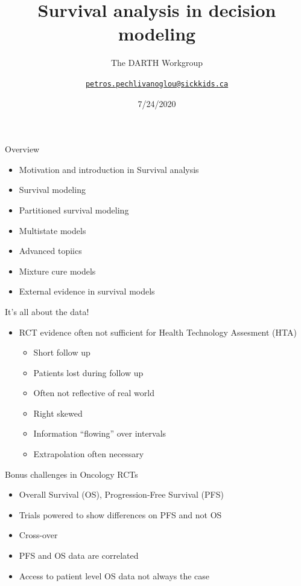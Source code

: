 \documentclass[ignorenonframetext,]{beamer}
\title{Survival analysis in decision modeling}
\subtitle{The DARTH Workgroup}
\author{\href{mailto:petros.pechlivanoglou@sickkids.ca}{\nolinkurl{petros.pechlivanoglou@sickkids.ca}}}
\date{7/24/2020}
\providecommand{\tightlist}{%
  \setlength{\itemsep}{0pt}\setlength{\parskip}{0pt}}
\begin{document}
\frame{\titlepage}

\begin{frame}{Overview}

\begin{itemize}
\tightlist
\item
  Motivation and introduction in Survival analysis
\item
  Survival modeling
\item
  Partitioned survival modeling
\item
  Multistate models
\item
  Advanced topiics
\item
  Mixture cure models
\item
  External evidence in survival models
\end{itemize}

\end{frame}

\begin{frame}{It's all about the data!}

\begin{itemize}
\tightlist
\item
  RCT evidence often not sufficient for Health Technology Assesment
  (HTA)

  \begin{itemize}
  \tightlist
  \item
    Short follow up
  \item
    Patients lost during follow up
  \item
    Often not reflective of real world
  \item
    Right skewed\\
  \item
    Information ``flowing'' over intervals
  \item
    Extrapolation often necessary
  \end{itemize}
\end{itemize}

\end{frame}

\begin{frame}{Bonus challenges in Oncology RCTs}

\begin{itemize}
\tightlist
\item
  Overall Survival (OS), Progression-Free Survival (PFS)
\item
  Trials powered to show differences on PFS and not OS
\item
  Cross-over
\item
  PFS and OS data are correlated
\item
  Access to patient level OS data not always the case
\end{itemize}

\end{frame}
\end{document}
